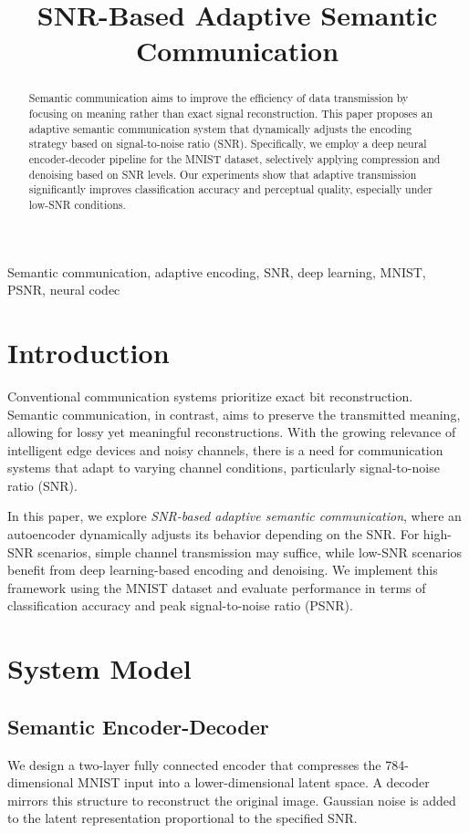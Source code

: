 \documentclass[conference]{IEEEtran}
\title{SNR-Based Adaptive Semantic Communication}
\author{
    \IEEEauthorblockN{First Author, Second Author, Third Author}
    \IEEEauthorblockA{
        Department of Electrical and Computer Engineering \\
        University Name, City, Country \\
        Email: \{first, second, third\}@university.edu
    }
}
\begin{document}
\maketitle

\begin{abstract}
Semantic communication aims to improve the efficiency of data transmission by focusing on meaning rather than exact signal reconstruction. This paper proposes an adaptive semantic communication system that dynamically adjusts the encoding strategy based on signal-to-noise ratio (SNR). Specifically, we employ a deep neural encoder-decoder pipeline for the MNIST dataset, selectively applying compression and denoising based on SNR levels. Our experiments show that adaptive transmission significantly improves classification accuracy and perceptual quality, especially under low-SNR conditions.
\end{abstract}

\begin{IEEEkeywords}
Semantic communication, adaptive encoding, SNR, deep learning, MNIST, PSNR, neural codec
\end{IEEEkeywords}

\section{Introduction}
Conventional communication systems prioritize exact bit reconstruction. Semantic communication, in contrast, aims to preserve the transmitted meaning, allowing for lossy yet meaningful reconstructions. With the growing relevance of intelligent edge devices and noisy channels, there is a need for communication systems that adapt to varying channel conditions, particularly signal-to-noise ratio (SNR).

In this paper, we explore \textit{SNR-based adaptive semantic communication}, where an autoencoder dynamically adjusts its behavior depending on the SNR. For high-SNR scenarios, simple channel transmission may suffice, while low-SNR scenarios benefit from deep learning-based encoding and denoising. We implement this framework using the MNIST dataset and evaluate performance in terms of classification accuracy and peak signal-to-noise ratio (PSNR).

\section{System Model}

\subsection{Semantic Encoder-Decoder}
We design a two-layer fully connected encoder that compresses the 784-dimensional MNIST input into a lower-dimensional latent space. A decoder mirrors this structure to reconstruct the original image. Gaussian noise is added to the latent representation proportional to the specified SNR.
\end{document}
